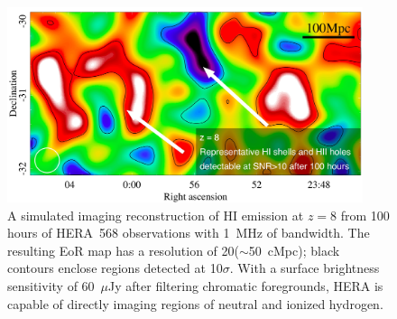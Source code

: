 \documentclass[preprint]{aastex}
\def\HI{{H{\small I }}}
\begin{document}

\begin{figure}[t] \centering
\includegraphics[height=2.25in]{plots/HERA_z8_SNR_wide_annotated.jpg}
\caption{\small 
A simulated imaging reconstruction of \HI emission at $z=8$ from 
100 hours of HERA~568 observations with 1~MHz of bandwidth.  The resulting
EoR map has a resolution of 20\arcmin ($\sim$50~cMpc); black contours
enclose regions detected at 10$\sigma$.
With a surface brightness sensitivity of 60~$\mu$Jy after filtering chromatic
foregrounds, HERA is capable of
directly imaging regions of neutral and ionized hydrogen.
\label{imaging}}
\end{figure}
\end{document}
